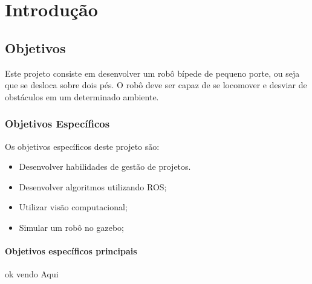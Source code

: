 \chapter{Introdução}
\label{chap:intro}






% 
\section{Objetivos}
\label{sec:obj}
Este projeto consiste em desenvolver um robô bípede de pequeno porte, ou seja que se desloca sobre dois pés. O robô deve ser capaz de se locomover e desviar de obstáculos em um determinado ambiente. 
\label{sec:obj}

\subsection{Objetivos Específicos}
\label{ssec:objesp}
Os objetivos específicos deste projeto são:
\begin{itemize}
      \item Desenvolver habilidades de gestão de projetos.
      \item Desenvolver algoritmos utilizando ROS;
      \item Utilizar visão computacional;
      \item Simular um robô no gazebo;
  \end{itemize}

\subsubsection*{Objetivos específicos principais}
\label{sssec:obj-principais}
ok vendo Aqui


